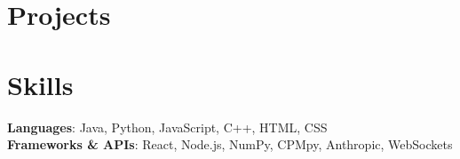 \documentclass[letterpaper,11pt]{article}
\makeatletter
\newcommand{\resumeItem}[1]{
  \item\small{
    {#1 \vspace{-2pt}}
  }
}
\newcommand{\resumeProjectHeading}[2]{
    \item
    \begin{tabular*}{0.97\textwidth}{l@{\extracolsep{\fill}}r}
      \small#1 & #2 \\
    \end{tabular*}\vspace{-7pt}
}
\newcommand{\resumeSubHeadingListStart}{\begin{itemize}[leftmargin=0.15in, label={}]}
\newcommand{\resumeSubHeadingListEnd}{\end{itemize}}
\newcommand{\resumeItemListStart}{\begin{itemize}}
\newcommand{\resumeItemListEnd}{\end{itemize}\vspace{-5pt}}
\makeatother
\begin{document}
\section{Projects}



\section{Skills}
 \begin{itemize}[leftmargin=0.15in, label={}]
    \small{\item{
     \textbf{Languages}{: Java, Python, JavaScript, C++, HTML, CSS} \\
     \textbf{Frameworks \& APIs}{: React, Node.js, NumPy, CPMpy, Anthropic, WebSockets}
    }}
 \end{itemize}


\end{document}
